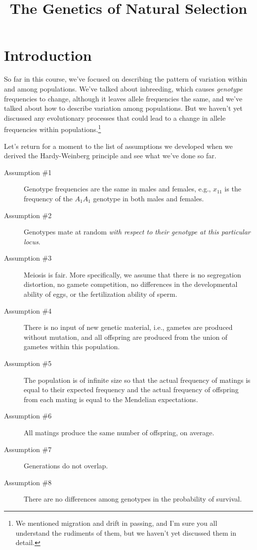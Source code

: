 \documentclass[12pt]{article}
\title{The Genetics of Natural Selection}
\begin{document}
\maketitle

\thispagestyle{first}

\section*{Introduction}

So far in this course, we've focused on describing the pattern of
variation within and among populations. We've talked about inbreeding,
which causes {\it genotype\/} frequencies to change, although it
leaves allele frequencies the same, and we've talked about how to
describe variation among populations. But we haven't yet discussed any
evolutionary processes that could lead to a change in allele
frequencies within populations.\footnote{We mentioned migration and
  drift in passing, and I'm sure you all understand the rudiments of
  them, but we haven't yet discussed them in detail.}

Let's return for a moment to the list of assumptions we developed when
we derived the Hardy-Weinberg principle and see what we've done so
far.

\begin{description}

\item[Assumption \#1] Genotype frequencies are the same in males and
females, e.g., $x_{11}$ is the frequency of the $A_1A_1$ genotype in
both males and females.

\item[Assumption \#2] Genotypes mate at random {\it with respect to
their genotype at this particular locus}.

\item[Assumption \#3] Meiosis is fair. More specifically, we assume
that there is no segregation distortion, no gamete competition, no
differences in the developmental ability of eggs, or the fertilization
ability of sperm.

\item[Assumption \#4] There is no input of new genetic material, i.e.,
gametes are produced without mutation, and all offspring are produced
from the union of gametes within this population.

\item[Assumption \#5] The population is of infinite size so that the
actual frequency of matings is equal to their expected frequency and
the actual frequency of offspring from each mating is equal to the
Mendelian expectations.

\item[Assumption \#6] All matings produce the same number of
offspring, on average.

\item[Assumption \#7] Generations do not overlap.

\item[Assumption \#8] There are no differences among genotypes in the
probability of survival.

\end{description}
\end{document}

